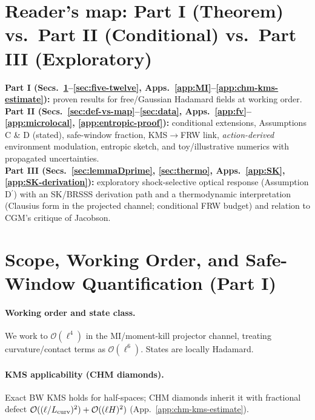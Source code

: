 \documentclass[aps,prd,onecolumn,superscriptaddress,nofootinbib]{revtex4-2}
\begin{document}
\maketitle

\section*{Reader’s map: Part I (Theorem) vs.\ Part II (Conditional) vs.\ Part III (Exploratory)}
\noindent \textbf{Part I (Secs.~\ref{sec:scope}–\ref{sec:five-twelve}, Apps.~\ref{app:MI}–\ref{app:chm-kms-estimate}):} proven results for free/Gaussian Hadamard fields at working order.\\
\textbf{Part II (Secs.~\ref{sec:def-vs-map}–\ref{sec:data}, Apps.~\ref{app:fv}–\ref{app:microlocal}, \ref{app:entropic-proof}):} conditional extensions, Assumptions C \& D (stated), safe-window fraction, KMS\(\to\)FRW link, \emph{action-derived} environment modulation, entropic sketch, and toy/illustrative numerics with propagated uncertainties.\\
\textbf{Part III (Secs.~\ref{sec:lemmaDprime}, \ref{sec:thermo}, Apps.~\ref{app:SK}, \ref{app:SK-derivation}):} exploratory shock-selective optical response (Assumption D\(^{\prime}\)) with an SK/BRSSS derivation path and a thermodynamic interpretation (Clausius form in the projected channel; conditional FRW budget) and relation to CGM’s critique of Jacobson.

\section{Scope, Working Order, and Safe-Window Quantification (Part I)}
\label{sec:scope}

\paragraph{Working order and state class.} We work to \(\mathcal O(\ell^4)\) in the MI/moment-kill projector channel, treating curvature/contact terms as \(\mathcal O(\ell^6)\). States are locally Hadamard.

\paragraph{KMS applicability (CHM diamonds).} Exact BW KMS holds for half-spaces; CHM diamonds inherit it with fractional defect \(\mathcal O((\ell/L_{\rm curv})^2)+\mathcal O((\ell H)^2)\) (App.~\ref{app:chm-kms-estimate}).
\end{document}
